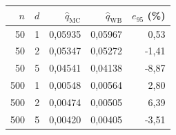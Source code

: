 \begin{tabular}{rrrrr}
\toprule
$n$ & $d$ & $\widehat q_{\mathrm{MC}}$ & $\widehat q_{\mathrm{WB}}$ & $e_{95}$ (\%)\\
\midrule
50 & 1 & 0,05935 & 0,05967 & 0,53 \\
50 & 2 & 0,05347 & 0,05272 & -1,41 \\
50 & 5 & 0,04541 & 0,04138 & -8,87 \\
500 & 1 & 0,00548 & 0,00564 & 2,80 \\
500 & 2 & 0,00474 & 0,00505 & 6,39 \\
500 & 5 & 0,00420 & 0,00405 & -3,51 \\
\bottomrule
\end{tabular}
